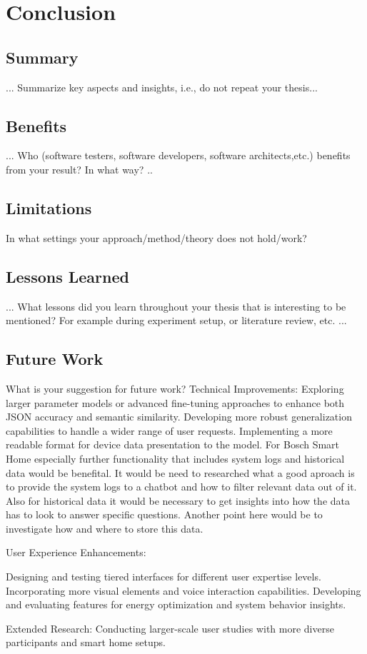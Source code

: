 
\chapter{Conclusion}\label{chap:conclusion}


\section{Summary}
... Summarize key aspects and insights, i.e., do not repeat your thesis...
\section{Benefits}
... Who (software testers, software developers, software architects,etc.) benefits from your result? In what way?   ..
\section{Limitations}
In what settings your approach/method/theory does not hold/work?
\section{Lessons Learned}
... What lessons did you learn throughout your thesis that is interesting to be mentioned? For example during experiment setup, or literature review, etc. ... 
\section{Future Work}
What is your suggestion for future work?
Technical Improvements:
Exploring larger parameter models or advanced fine-tuning approaches to enhance both JSON accuracy and semantic similarity.
Developing more robust generalization capabilities to handle a wider range of user requests.
Implementing a more readable format for device data presentation to the model.
For Bosch Smart Home especially further functionality that includes system logs and historical data would be benefital. It would be need to researched what a good aproach is to provide the system logs to a chatbot and how to filter relevant data out of it. Also for historical data it would be necessary to get insights into how the data has to look to answer specific questions. Another point here would be to investigate how and where to store this data.

User Experience Enhancements:

Designing and testing tiered interfaces for different user expertise levels.
Incorporating more visual elements and voice interaction capabilities.
Developing and evaluating features for energy optimization and system behavior insights.

Extended Research:
Conducting larger-scale user studies with more diverse participants and smart home setups.